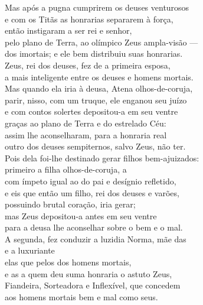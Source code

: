 \begin{pages}
\begin{Rightside}
\Para
Mas após a pugna cumprirem os deuses venturosos\\
e com os Titãs as honrarias separarem à força,\\
então instigaram a ser rei e senhor,\\
pelo plano de Terra, ao olímpico Zeus ampla-visão ---\\
dos imortais; e ele bem distribuiu suas honrarias.\\

\quad{}Zeus, rei dos deuses, fez de  a primeira esposa,\\
a mais inteligente entre os deuses e homens mortais.\\
Mas quando ela iria à deusa, Atena olhos-de-coruja,\\
parir, nisso, com um truque, ele enganou seu juízo\\
e com contos solertes depositou-a em seu ventre \\
graças ao plano de Terra e do estrelado Céu:\\
assim lhe aconselharam, para a honraria real\\
outro dos deuses sempiternos, salvo Zeus, não ter.\\
Pois dela foi-lhe destinado gerar filhos bem-ajuizados:\\
primeiro a filha olhos-de-coruja, a  \\
com ímpeto igual ao do pai e desígnio refletido,\\
e eis que então um filho, rei dos deuses e varões,\\
possuindo brutal coração, iria gerar;\\
mas Zeus depositou-a antes em seu ventre\\
para a deusa lhe aconselhar sobre o bem e o mal. \\

\quad{}A segunda, fez conduzir a luzidia Norma, mãe das \\
  e a luxuriante \\
elas que 
pelos  dos homens mortais,\\
e as  a quem deu suma honraria o astuto Zeus,\\
Fiandeira, Sorteadora e Inflexível, que concedem \\
aos homens mortais bem e mal como seus.\\


\end{Rightside}
\end{pages}
